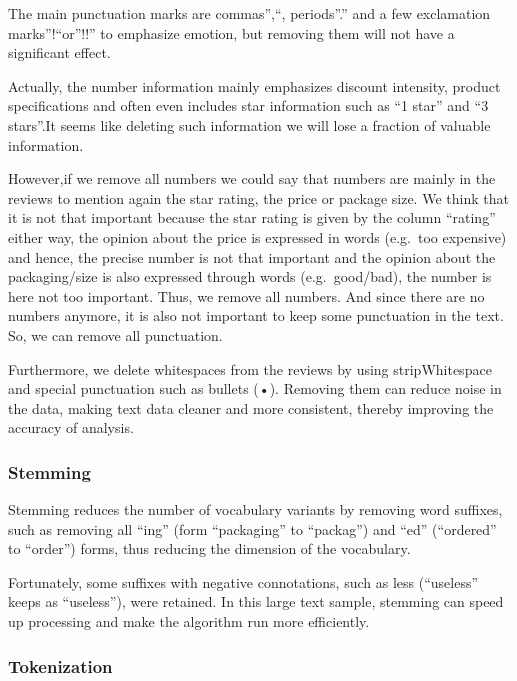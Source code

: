 \documentclass[
]{article}
\begin{document}
The main punctuation marks are commas'',``, periods''.'' and a few
exclamation marks''!``or''!!'' to emphasize emotion, but removing them
will not have a significant effect.

Actually, the number information mainly emphasizes discount intensity,
product specifications and often even includes star information such as
``1 star'' and ``3 stars''.It seems like deleting such information we
will lose a fraction of valuable information.

However,if we remove all numbers we could say that numbers are mainly in
the reviews to mention again the star rating, the price or package size.
We think that it is not that important because the star rating is given
by the column ``rating'' either way, the opinion about the price is
expressed in words (e.g.~too expensive) and hence, the precise number is
not that important and the opinion about the packaging/size is also
expressed through words (e.g.~good/bad), the number is here not too
important. Thus, we remove all numbers. And since there are no numbers
anymore, it is also not important to keep some punctuation in the text.
So, we can remove all punctuation.

Furthermore, we delete whitespaces from the reviews by using
stripWhitespace and special punctuation such as bullets (•). Removing
them can reduce noise in the data, making text data cleaner and more
consistent, thereby improving the accuracy of analysis.

\hypertarget{stemming}{%
\subsubsection{Stemming}\label{stemming}}

Stemming reduces the number of vocabulary variants by removing word
suffixes, such as removing all ``ing'' (form ``packaging'' to
``packag'') and ``ed'' (``ordered'' to ``order'') forms, thus reducing
the dimension of the vocabulary.

Fortunately, some suffixes with negative connotations, such as less
(``useless'' keeps as ``useless''), were retained. In this large text
sample, stemming can speed up processing and make the algorithm run more
efficiently.

\hypertarget{tokenization}{%
\subsubsection{Tokenization}\label{tokenization}}
\end{document}
